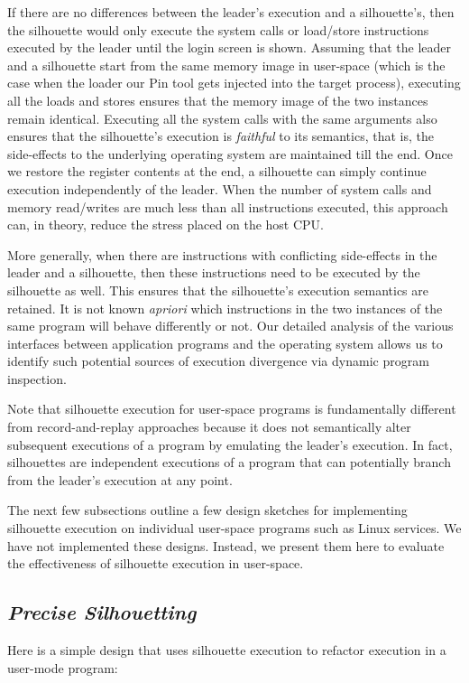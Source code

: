 If there are no differences between the leader's
execution and a silhouette's, then the silhouette would only
execute the system calls or load/store instructions
executed by the leader until the login screen is shown.
Assuming that the leader and a silhouette start from the same
memory image in user-space (which is the case when the loader 
our Pin tool gets injected into the target process), executing all the loads and stores
ensures that the memory image of the two instances
remain identical. Executing all the system
calls with the same arguments also ensures
that the silhouette's execution is {\em faithful}
to its semantics, that is, the side-effects to the underlying
operating system are maintained till the end.
Once we restore the register contents
at the end, a silhouette can simply continue
execution independently of the leader.
When the number of system calls and memory read/writes
are much less than all instructions executed,
this approach can, in theory, reduce the stress
placed on the host CPU. 

More generally, when there are instructions
with conflicting side-effects in the leader
and a silhouette, then these instructions
need to be executed by the silhouette as well.
This ensures that the silhouette's execution
semantics are retained. 
It is not known {\em apriori} which instructions in the
two instances of the same program will behave
differently or not.
Our detailed analysis of the various interfaces
between application programs and the operating system
allows us to identify such potential sources of
execution divergence via dynamic 
program inspection.

Note that silhouette execution for user-space programs is fundamentally different
from record-and-replay approaches because it
does not semantically alter subsequent executions
of a program by emulating the leader's execution. 
In fact, silhouettes are independent executions of a program
that can potentially branch from the leader's execution at any point.

The next few subsections outline a few
design sketches for implementing silhouette execution
on individual user-space programs
such as Linux services.
We have not implemented these designs.
Instead, we present them here 
to evaluate the effectiveness of silhouette
execution in user-space.

\subsection{{\em Precise Silhouetting}}\label{precise:sil}
Here is a simple design that uses silhouette execution 
to refactor execution in a user-mode program:

